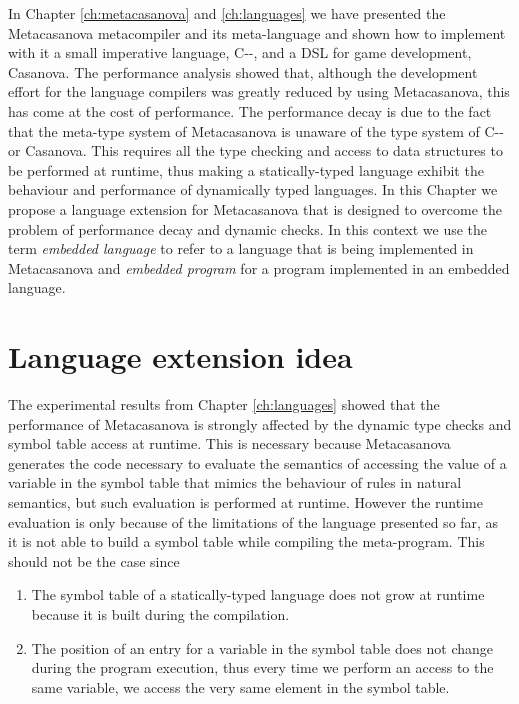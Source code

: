 In Chapter \ref{ch:metacasanova} and \ref{ch:languages} we have presented the Metacasanova metacompiler and its meta-language and shown how to implement with it a small imperative language, C-{}-, and a DSL for game development, Casanova. The performance analysis showed that, although the development effort for the language compilers was greatly reduced by using Metacasanova, this has come at the cost of performance. The performance decay is due to the fact that the meta-type system of Metacasanova is unaware of the type system of C-{}- or Casanova. This requires all the type checking and access to data structures to be performed at runtime, thus making a statically-typed language exhibit the behaviour and performance of dynamically typed languages. In this Chapter we propose a language extension \cite{DiGiacomo2017SLE} for Metacasanova that is designed to overcome the problem of performance decay and dynamic checks. In this context we use the term \textit{embedded language} to refer to a language that is being implemented in Metacasanova and \textit{embedded program} for a program implemented in an embedded language.

\section{Language extension idea}
\label{sec:ch_functors_idea}
The experimental results from Chapter \ref{ch:languages} showed that the performance of Metacasanova is strongly affected by the dynamic type checks and symbol table access at runtime. This is necessary because Metacasanova generates the code necessary to evaluate the semantics of accessing the value of a variable in the symbol table that mimics the behaviour of rules in natural semantics, but such evaluation is performed at runtime. However the runtime evaluation is only because of the limitations of the language presented so far, as it is not able to build a symbol table while compiling the meta-program. This should not be the case since

\begin{enumerate}
	\item The symbol table of a statically-typed language does not grow at runtime because it is built during the compilation.
	\item The position of an entry for a variable in the symbol table does not change during the program execution, thus every time we perform an access to the same variable, we access the very same element in the symbol table.
\end{enumerate}

